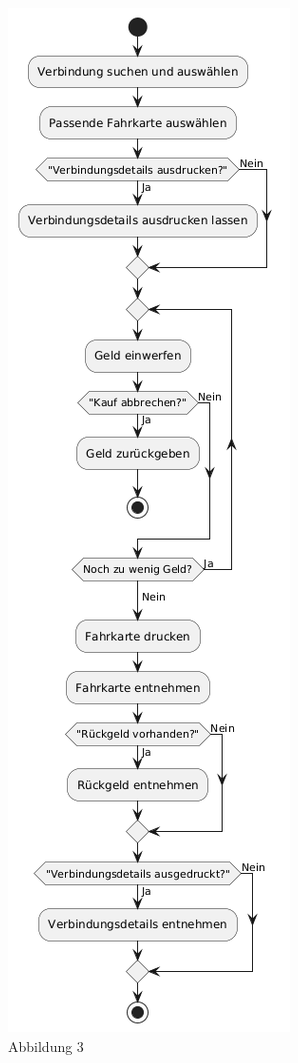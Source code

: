 \documentclass[12pt]{article}
\begin{document}
\begin{figure}[H]
  \centering
  \includegraphics[width=\linewidth, height=0.9\textheight,keepaspectratio]{3.png}
  \caption{Abbildung 3}
\end{figure}
\end{document}
